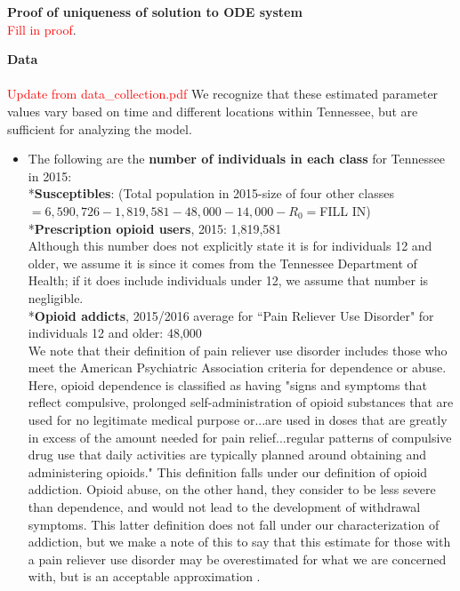 \documentclass[12pt]{article}
\begin{document}
 \textbf{Proof of uniqueness of solution to ODE system} \\
\textcolor{red}{Fill in proof}. 








\textbf{Data} \\ \\
\textcolor{red}{Update from data\_collection.pdf}
We recognize that these estimated parameter values vary based on time and different locations within Tennessee, but are sufficient for analyzing the model. 
\begin{itemize}



\item The following are the \textbf{number of individuals in each class} for Tennessee in 2015: \\

*\textbf{Susceptibles}: (Total population in 2015-size of four other classes$=6,590,726-1,819,581-48,000-14,000-R_{0}=$FILL IN) \cite{USCensus} \\

*\textbf{Prescription opioid users}, 2015: 1,819,581 \cite{TNgov1} \\
Although this number does not explicitly state it is for individuals 12 and older, we assume it is since it comes from the Tennessee Department of Health; if it does include individuals under 12, we assume that number is negligible. \\

*\textbf{Opioid addicts}, 2015/2016 average for ``Pain Reliever Use Disorder" for individuals 12 and older: 48,000 \cite{NSDUH2} \\
We note that their definition of pain reliever use disorder includes those who meet the American Psychiatric Association criteria for dependence or abuse. Here, opioid dependence is classified as having "signs and symptoms that reflect compulsive, prolonged self-administration of opioid substances that are used for no legitimate medical purpose or...are used in doses that are greatly in excess of the amount needed for pain relief...regular patterns of compulsive drug use that daily activities are typically planned around obtaining and administering opioids." This definition falls under our definition of opioid addiction. Opioid abuse, on the other hand, they consider to be less severe than dependence, and would not lead to the development of withdrawal symptoms. This latter definition does not fall under our characterization of addiction, but we make a note of this to say that this estimate for those with a pain reliever use disorder may be overestimated for what we are concerned with, but is an acceptable approximation  \cite{DSM}.\\


\end{itemize}
\end{document}
